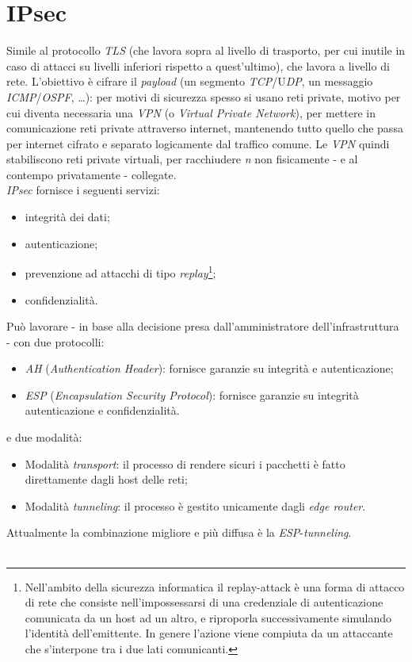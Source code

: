 \section{IPsec}
Simile al protocollo \textit{TLS} (che lavora sopra al livello di trasporto, per cui inutile in caso di attacci su livelli inferiori rispetto a quest'ultimo), che lavora a livello di rete. L'obiettivo è cifrare il \textit{payload} (un segmento \textit{TCP}/U\textit{DP}, un messaggio \textit{ICMP}/\textit{OSPF}, \ldots): per motivi di sicurezza spesso si usano reti private, motivo per cui diventa necessaria una \textit{VPN} (o \textit{Virtual Private Network}), per mettere in comunicazione reti private attraverso internet, mantenendo tutto quello che passa per internet cifrato e separato logicamente dal traffico comune. Le \textit{VPN} quindi stabiliscono reti private virtuali, per racchiudere \textit{n} non fisicamente - e al contempo privatamente - collegate. \\
\textit{IPsec} fornisce i seguenti servizi:
\begin{itemize}
	\item integrità dei dati;
	\item autenticazione;
	\item prevenzione ad attacchi di tipo \textit{replay}\footnote{Nell'ambito della sicurezza informatica il replay-attack è una forma di attacco di rete che consiste nell'impossessarsi di una credenziale di autenticazione comunicata da un host ad un altro, e riproporla successivamente simulando l'identità dell'emittente. In genere l'azione viene compiuta da un attaccante che s'interpone tra i due lati comunicanti.};
	\item confidenzialità.
\end{itemize}
Può lavorare - in base alla decisione presa dall'amministratore dell'infrastruttura - con due protocolli:
\begin{itemize}
	\item \textit{AH} (\textit{Authentication Header}): fornisce garanzie su integrità e autenticazione;
	\item \textit{ESP} (\textit{Encapsulation Security Protocol}): fornisce garanzie su integrità autenticazione e confidenzialità.
\end{itemize}
e due modalità:
\begin{itemize}
	\item Modalità \textit{transport}: il processo di rendere sicuri i pacchetti è fatto direttamente dagli host delle reti;
	\item Modalità \textit{tunneling}: il processo è gestito unicamente dagli \textit{edge router}.
\end{itemize}
Attualmente la combinazione migliore e più diffusa è la \textit{ESP}-\textit{tunneling}. \\ \\

